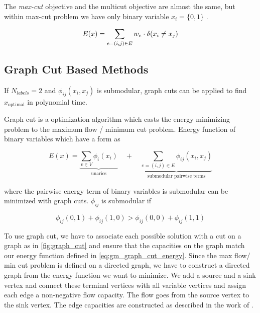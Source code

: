 The \emph{max-cut} objective and  the multicut objective
are almost the same, 
but within max-cut problem we have only binary variable $x_i=\{0,1\}$ .

\begin{align}
E(x)=
    \sum_{ e=(i,j) \in E}
        w_e \cdot \delta( x_i \neq x_j )
    \label{eq:gm_ef_max_cut}
\end{align}




\subsection{Graph Cut Based Methods}

If $N_{labels}=2$ and $\phi_{ij}(x_i,x_j)$ is submodular, 
graph cuts \cite{boykov_2001_pami,kolmogorov_2004_pami} can be applied to find $x_{\text{optimal}}$
in polynomial time.

Graph cut is a optimization algorithm which casts the energy minimizing problem
to the maximum flow / minimum cut problem. Energy function of binary variables which
have a form as 

\begin{equation} \label{eq:gm_graph_cut_energy}
    E(x) = 
    \underbrace{
        \sum_{v \in V} \phi_i(x_i)
    }_{\text{unaries}}
     \quad +  \quad
    \underbrace{
        \sum_{e=(i,j) \in E } \phi_{ij}(x_i,x_j) 
    }_{\text{submodular pairwise terms}}
\end{equation}



where the pairwise energy term of binary variables is submodular can be minimized with
graph cuts. $\phi_{ij}$ is submodular if

\begin{equation} \label{eq:gm_submodular_criterion}
    \phi_{ij}(0,1) + \phi_{ij}(1,0) >  \phi_{ij}(0,0) + \phi_{ij}(1,1)
\end{equation}

To use graph cut, we have to associate each possible solution with a cut on a graph as in
\cref{fig:graph_cut} and ensure that the capacities on the graph match our energy function 
defined in \cref{eq:gm_graph_cut_energy}.
Since the max flow/ min cut problem is defined on a directed graph, we have to construct
a directed graph from the energy function we want to minimize. We add a source and a
sink vertex and connect these terminal vertices with all variable vertices and assign
each edge a non-negative flow capacity. The flow goes from the source vertex to the
sink vertex. The edge capacities are constructed as described in the work of
\citet{kolmogorov_2004_pami}.

